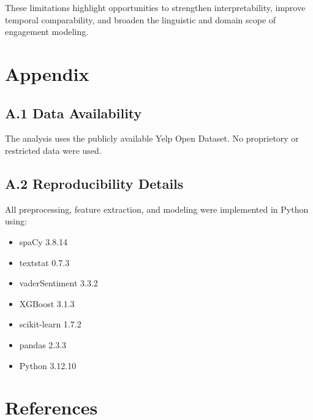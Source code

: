 \documentclass[12pt]{article}
\begin{document}
These limitations highlight opportunities to strengthen interpretability, improve temporal comparability, and broaden the linguistic and domain scope of engagement modeling.





\section*{Appendix}

\subsection*{A.1 Data Availability}

The analysis uses the publicly available Yelp Open Dataset. No proprietory or restricted data were used. 

\subsection*{A.2 Reproducibility Details}

All preprocessing, feature extraction, and modeling were implemented in Python using:

\begin{itemize}
\item spaCy 3.8.14
\item textstat 0.7.3
\item vaderSentiment 3.3.2
\item XGBoost 3.1.3
\item scikit-learn 1.7.2
\item pandas 2.3.3
\item Python 3.12.10
\end{itemize}

\section*{References}
\end{document}

